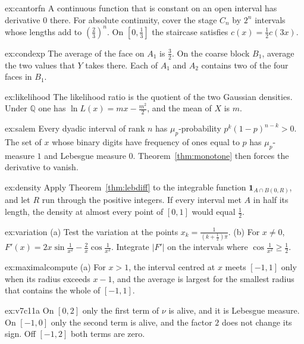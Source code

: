 \begin{hint}{ex:cantorfn}
A continuous function that is constant on an open interval has derivative $0$ there. For absolute continuity, cover the stage $C_n$ by $2^n$ intervals whose lengths add to $(\frac23)^n$. On $[0,\frac13]$ the staircase satisfies $c(x)=\frac12c(3x)$.
\end{hint}
\begin{hint}{ex:condexp}
The average of the face on $A_1$ is $\frac32$. On the coarse block $B_1$, average the two values that $Y$ takes there. Each of $A_1$ and $A_2$ contains two of the four faces in $B_1$.
\end{hint}
\begin{hint}{ex:likelihood}
The likelihood ratio is the quotient of the two Gaussian densities. Under $\mathbb Q$ one has $\ln L(x)=mx-\frac{m^2}2$, and the mean of $X$ is $m$.
\end{hint}
\begin{hint}{ex:salem}
Every dyadic interval of rank $n$ has $\mu_p$-probability $p^k(1-p)^{n-k}>0$. The set of $x$ whose binary digits have frequency of ones equal to $p$ has $\mu_p$-measure $1$ and Lebesgue measure $0$. Theorem~\ref{thm:monotone} then forces the derivative to vanish.
\end{hint}
\begin{hint}{ex:density}
Apply Theorem~\ref{thm:lebdiff} to the integrable function $\mathbf 1_{A\cap B(0,R)}$, and let $R$ run through the positive integers. If every interval met $A$ in half its length, the density at almost every point of $[0,1]$ would equal $\frac12$.
\end{hint}
\begin{hint}{ex:variation}
(a) Test the variation at the points $x_k=\frac1{(k+\frac12)\pi}$. (b) For $x\ne0$, $F'(x)=2x\sin\frac1{x^2}-\frac2x\cos\frac1{x^2}$. Integrate $|F'|$ on the intervals where $\cos\frac1{x^2}\ge\frac12$.
\end{hint}
\begin{hint}{ex:maximalcompute}
(a) For $x>1$, the interval centred at $x$ meets $[-1,1]$ only when its radius exceeds $x-1$, and the average is largest for the smallest radius that contains the whole of $[-1,1]$.
\end{hint}
\begin{hint}{ex:v7c11a}
On $[0,2]$ only the first term of $\nu$ is alive, and it is Lebesgue measure. On $[-1,0]$ only the second term is alive, and the factor $2$ does not change its sign. Off $[-1,2]$ both terms are zero.
\end{hint}
